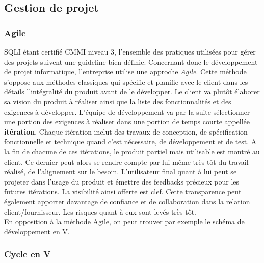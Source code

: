 \documentclass{report}
\begin{document}
\newpage





\subsection{Gestion de projet}
\subsubsection{Agile}
SQLI étant certifié CMMI niveau 3, l'ensemble des pratiques utilisées pour gérer des projets suivent une \gls{guideline} bien définie. 
Concernant donc le développement de projet informatique, l'entreprise utilise une approche \emph{Agile}. 
Cette méthode s'oppose aux méthodes classiques qui spécifie et planifie avec le client dans les détails l'intégralité du produit avant de le développer. 
Le client va plutôt élaborer sa vision du produit à réaliser ainsi que la liste des fonctionnalités et des exigences à développer. L'équipe de développement va par la suite sélectionner une portion des exigences à réaliser dans une portion de temps courte appellée \textbf{itération}. 
Chaque itération inclut des travaux de conception, de spécification fonctionnelle et technique quand c’est nécessaire, de développement et de test. A la fin de chacune de ces itérations, le produit partiel mais utilisable est montré au client. Ce dernier peut alors se rendre compte par lui même très tôt du travail réalisé, de l’alignement sur le besoin. L’utilisateur final quant à lui peut se projeter dans l’usage du produit et émettre des feedbacks précieux pour les futures itérations. La visibilité ainsi offerte est clef. Cette transparence peut également apporter davantage de confiance et de collaboration dans la relation client/fournisseur. Les risques quant à eux sont levés très tôt.  \\

En opposition à la méthode Agile, on peut trouver par exemple le schéma de développement en V.
\subsubsection{Cycle en V}
\end{document}
